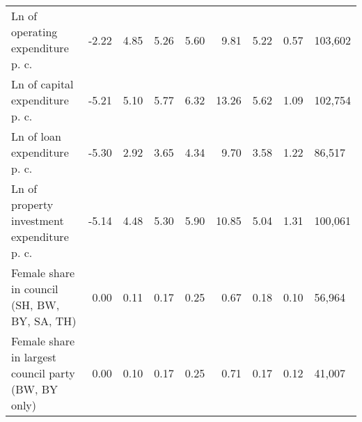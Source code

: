 \begin{tabular}{lrrrrrrrl}
  Ln of operating expenditure p. c. & -2.22 & 4.85 & 5.26 & 5.60 & 9.81 & 5.22 & 0.57 & 103,602 \\ 
  Ln of capital expenditure p. c. & -5.21 & 5.10 & 5.77 & 6.32 & 13.26 & 5.62 & 1.09 & 102,754 \\ 
  Ln of loan expenditure p. c. & -5.30 & 2.92 & 3.65 & 4.34 & 9.70 & 3.58 & 1.22 & 86,517 \\ 
  Ln of property investment expenditure p. c. & -5.14 & 4.48 & 5.30 & 5.90 & 10.85 & 5.04 & 1.31 & 100,061 \\ 
  Female share in council (SH, BW, BY, SA, TH) & 0.00 & 0.11 & 0.17 & 0.25 & 0.67 & 0.18 & 0.10 & 56,964 \\ 
  Female share in largest council party (BW, BY only) & 0.00 & 0.10 & 0.17 & 0.25 & 0.71 & 0.17 & 0.12 & 41,007 \\ 
   \bottomrule
\end{tabular}
